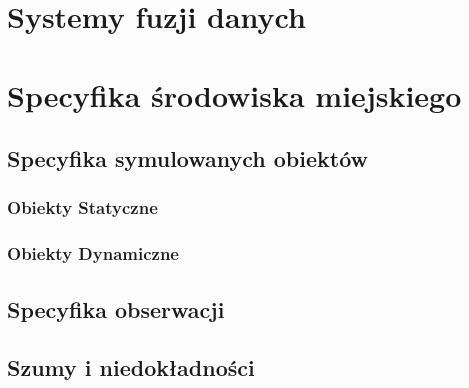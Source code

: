 \section[Systemy fuzji danych][Systemy fuzji danych]{Systemy fuzji danych}
\section[Specyfika środowiska miejskiego][Specyfika środowiska miejskiego]{Specyfika środowiska miejskiego}
\subsection{Specyfika symulowanych obiektów}
\subsubsection{Obiekty Statyczne}
\subsubsection{Obiekty Dynamiczne}
\subsection{Specyfika obserwacji}
\subsection{Szumy i niedokładności}